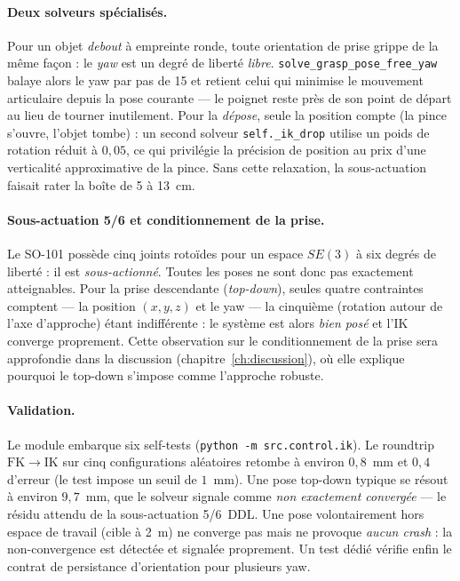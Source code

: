 \paragraph{Deux solveurs spécialisés.} Pour un objet \emph{debout} à empreinte
ronde, toute orientation de prise grippe de la même façon : le \textit{yaw} est un
degré de liberté \emph{libre}. \texttt{solve\_grasp\_pose\_free\_yaw} balaye alors
le yaw par pas de 15\textdegree{} et retient celui qui minimise le mouvement
articulaire depuis la pose courante — le poignet reste près de son point de départ
au lieu de tourner inutilement. Pour la \emph{dépose}, seule la position compte
(la pince s'ouvre, l'objet tombe) : un second solveur \texttt{self.\_ik\_drop}
utilise un poids de rotation réduit à $0{,}05$, ce qui privilégie la précision de
position au prix d'une verticalité approximative de la pince. Sans cette
relaxation, la sous-actuation faisait rater la boîte de 5 à 13~cm.

\paragraph{Sous-actuation 5/6 et conditionnement de la prise.} Le SO-101 possède
cinq joints rotoïdes pour un espace $SE(3)$ à six degrés de liberté : il est
\emph{sous-actionné}. Toutes les poses ne sont donc pas exactement atteignables.
Pour la prise descendante (\textit{top-down}), seules quatre contraintes
comptent — la position $(x,y,z)$ et le yaw — la cinquième (rotation autour de
l'axe d'approche) étant indifférente : le système est alors \emph{bien posé} et
l'IK converge proprement. Cette observation sur le conditionnement de la prise
sera approfondie dans la discussion (chapitre~\ref{ch:discussion}), où elle
explique pourquoi le top-down s'impose comme l'approche robuste.

\paragraph{Validation.} Le module embarque six self-tests
(\texttt{python -m src.control.ik}). Le roundtrip $\mathrm{FK}\to\mathrm{IK}$ sur
cinq configurations aléatoires retombe à environ $0{,}8$~mm et $0{,}4$\textdegree{}
d'erreur (le test impose un seuil de $1$~mm). Une pose top-down typique se résout
à environ $9{,}7$~mm, que le solveur signale comme \emph{non exactement convergée}
--- le résidu attendu de la sous-actuation 5/6~DDL. Une pose volontairement hors espace
de travail (cible à 2~m) ne converge pas mais ne provoque \emph{aucun crash} :
la non-convergence est détectée et signalée proprement. Un test dédié vérifie
enfin le contrat de persistance d'orientation pour plusieurs yaw.

